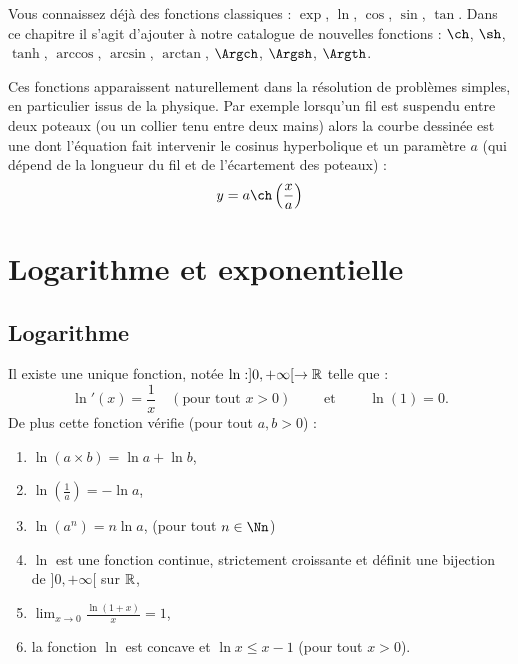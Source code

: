 \documentclass[class=report,crop=false]{standalone}
\begin{document}





\bigskip

Vous connaissez déjà des fonctions classiques : 
$\exp$, $\ln$, $\cos$, $\sin$, $\tan$.
Dans ce chapitre il s'agit d'ajouter à notre catalogue de nouvelles fonctions :
$\ch$, $\sh$, $\tanh$, $\arccos$, $\arcsin$, $\arctan$, $\Argch$, $\Argsh$, 
$\Argth$.

Ces fonctions apparaissent naturellement dans la résolution de problèmes simples,
en particulier issus de la physique.
Par exemple lorsqu'un fil est suspendu entre deux poteaux (ou un collier tenu entre deux mains)
alors la courbe dessinée est une  dont l'équation fait intervenir le cosinus hyperbolique
et un paramètre $a$ (qui dépend de la longueur du fil et de l'écartement des poteaux) :
$$y = a\ch \left( \frac x a \right)$$



\section{Logarithme et exponentielle}

\subsection{Logarithme}


\begin{proposition}
Il existe une unique fonction, notée $\ln : ]0,+\infty[ \to \mathbb{R}$ telle que :
$$\ln'(x) = \frac 1x \quad (\text{pour tout } x>0) \qquad \text { et } \qquad \ln(1) = 0.$$
De plus cette fonction vérifie (pour tout $a,b >0$) :
\begin{enumerate}
  \item $\ln (a \times b) = \ln a + \ln b$,
  \item $\ln(\frac 1 a) = - \ln a$,
  \item $\ln(a^n) = n \ln a$, (pour tout $n \in \Nn$)
  \item $\ln$ est une fonction continue, strictement croissante et définit une bijection de
$]0,+\infty[$ sur $\mathbb{R}$,
  \item $\lim_{x\to0}\frac{\ln(1+x)}{x} = 1$,
  \item la fonction $\ln$ est concave et $\ln x \le x-1$ (pour tout $x>0$).
\end{enumerate}
\end{proposition}
\end{document}
